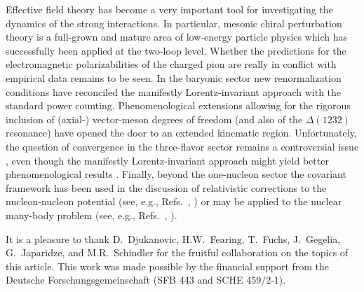 \documentclass[twoside,12pt]{article}
\begin{document}
   Effective field theory has become a very important tool for investigating
the dynamics of the strong interactions.
   In particular, mesonic chiral perturbation theory is a full-grown and mature
area of low-energy particle physics which has successfully been
applied at the two-loop level.
   Whether the predictions for the electromagnetic polarizabilities of the
charged pion are really in conflict with empirical data remains to be seen.
   In the baryonic sector new renormalization conditions have reconciled
the manifestly Lorentz-invariant approach with the standard power counting.
   Phenomenological extensions allowing for the rigorous inclusion of (axial-)
vector-meson degrees of freedom (and also of the $\Delta(1232)$ resonance)
have opened the door to an extended kinematic region.
   Unfortunately, the question of convergence in the three-flavor
sector remains a controversial issue \cite{Lehnhart:2004vi}, even
though the manifestly Lorentz-invariant approach might yield better
phenomenological results \cite{Geng:2008mf}.
   Finally, beyond the one-nucleon sector the covariant framework has been used
in the discussion of relativistic corrections to the nucleon-nucleon potential
(see, e.g., Refs.\ \cite{Higa:2003jk}, \cite{Robilotta:2006xp}) or may be applied
to the nuclear many-body problem (see, e.g., Refs.\ \cite{Furnstahl:2003cd}, \cite{Serot:2003ed}).


\medskip
   It is a pleasure to thank D.~Djukanovic, H.W.~Fearing, T.~Fuchs, J.~Gegelia,
G.~Japaridze, and M.R.~Schindler for the fruitful collaboration on the topics
of this article.
   This work was made possible by the financial support from the Deutsche
Forschungsgemeinschaft (SFB 443 and SCHE 459/2-1).
\end{document}
